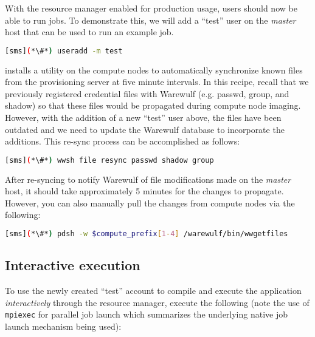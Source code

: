 With the resource manager enabled for production usage, users should now be
able to run jobs. To demonstrate this, we will add a ``test'' user on the {\em master}
host that can be used to run an example job.

\begin{lstlisting}[language=bash,keywords={}]
[sms](*\#*) useradd -m test
\end{lstlisting}

\Warewulf{} installs a utility on the compute nodes to automatically 
synchronize known files from the provisioning server at five minute intervals. In this
recipe, recall that we previously registered credential files with Warewulf (e.g. passwd,
group, and shadow) so that these files would be propagated during compute node
imaging. However, with the addition of a new ``test'' user above, the files
have been outdated and we need to update the Warewulf database to incorporate
the additions. This re-sync process can be accomplished as follows:

\begin{lstlisting}[language=bash,keywords={}]
[sms](*\#*) wwsh file resync passwd shadow group
\end{lstlisting}


\begin{center}
\begin{tcolorbox}[]
\small
After re-syncing to notify Warewulf of file modifications made on the {\em
master} host, it should take approximately 5 minutes for the changes to
propagate. However, you can also manually pull the changes from compute nodes
via the following:
\begin{lstlisting}[language=bash,keywords={}]
[sms](*\#*) pdsh -w $compute_prefix[1-4] /warewulf/bin/wwgetfiles 
\end{lstlisting}
\end{tcolorbox}
\end{center}




\subsection{Interactive execution}
To use the newly created ``test'' account to compile and execute the
application {\em interactively} through the resource manager, execute the
following (note the use of \texttt{mpiexec} for parallel job launch which summarizes
the underlying native job launch mechanism being used):

